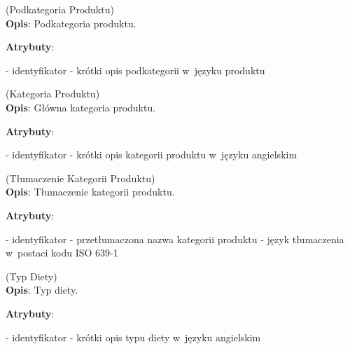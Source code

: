 \begin{enumerate}[label={\textbf{KAT/2/\protect\twodigits{\theenumi}}}, wide, labelwidth=!, labelindent=0pt, labelsep=0pt, series=reqs]
    \label{kat:ProductSubcategory} (Podkategoria Produktu)\\
    \indent\textbf{Opis}: Podkategoria produktu.
    \par
    \textbf{Atrybuty}:
    \begin{itemize}[series=atr, wide, align=left, leftmargin=190pt]
        \label{kat:ProductSubcategory:id}- identyfikator
        \label{kat:ProductSubcategory:description}- krótki opis podkategorii w~języku produktu
    \end{itemize}

    \label{kat:ProductCategory} (Kategoria Produktu)\\
    \indent\textbf{Opis}: Główna kategoria produktu.
    \par
    \textbf{Atrybuty}:
    \begin{itemize}[series=atr, wide, align=left, leftmargin=190pt]
        \label{kat:ProductCategory:id}- identyfikator
        \label{kat:ProductCategory:description}- krótki opis kategorii produktu w~języku angielskim
    \end{itemize}

    \label{kat:ProductCategoryTranslation} (Tłumaczenie Kategorii Produktu)\\
    \indent\textbf{Opis}: Tłumaczenie kategorii produktu.
    \par
    \textbf{Atrybuty}:
    \begin{itemize}[series=atr, wide, align=left, leftmargin=190pt]
        \label{kat:ProductCategoryTranslation:id}- identyfikator
        \label{kat:ProductCategoryTranslation:translation}- przetłumaczona nazwa kategorii produktu
        \label{kat:ProductCategoryTranslation:language}- język tłumaczenia w~postaci kodu ISO 639-1
    \end{itemize}

    \label{kat:DietType} (Typ Diety)\\
    \indent\textbf{Opis}: Typ diety.
    \par
    \textbf{Atrybuty}:
    \begin{itemize}[series=atr, wide, align=left, leftmargin=190pt]
        \label{kat:DietType:id}- identyfikator
        \label{kat:DietType:name}- krótki opis typu diety w~języku angielskim
    \end{itemize}


\end{enumerate}
